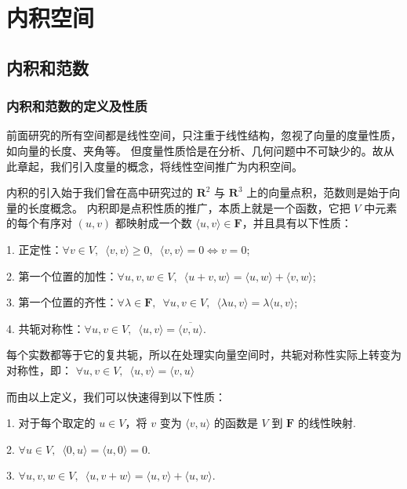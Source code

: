 \chapter{内积空间}

\section{内积和范数}
\subsection{内积和范数的定义及性质}
前面研究的所有空间都是线性空间，只注重于线性结构，忽视了向量的度量性质，如向量的长度、夹角等。
但度量性质恰是在分析、几何问题中不可缺少的。故从此章起，我们引入度量的概念，将线性空间推广为内积空间。

\vspace{2ex} 

内积的引入始于我们曾在高中研究过的 $\mathbf{R}^{2}$ 与 $\mathbf{R}^{3}$ 上的向量点积，范数则是始于向量的长度概念。
内积即是点积性质的推广，本质上就是一个函数，它把 $ V $ 中元素的每个有序对 $(u, v)$ 都映射成一个数 
$ \langle u, v \rangle \in \mathbf{F}$，并且具有以下性质：

1. 正定性：$\forall v \in V, \enspace \langle v, v \rangle \geqslant 0, \enspace \langle v, v \rangle = 0 \Leftrightarrow v = 0$; 

2. 第一个位置的加性：$\forall u, v, w \in V, \enspace \langle u + v, w \rangle = \langle u, w \rangle + \langle v, w \rangle$;

3. 第一个位置的齐性：$\forall \lambda \in \mathbf{F}, \enspace \forall u, v \in V, 
\enspace \langle \lambda u, v \rangle = \lambda \langle u, v \rangle$;

4. 共轭对称性：$\forall u, v \in V, \enspace \langle u, v \rangle = \overline{\langle v, u \rangle}$.

每个实数都等于它的复共轭，所以在处理实向量空间时，共轭对称性实际上转变为对称性，即：
$\forall u, v \in V, \enspace \langle u, v \rangle = \langle v, u \rangle$

而由以上定义，我们可以快速得到以下性质：

1. 对于每个取定的 $u \in V$，将 $ v $ 变为 $\langle v, u \rangle$ 的函数是 $ V $ 到 $\mathbf{F}$ 的线性映射.

2. $\forall u \in V, \enspace \langle 0, u \rangle = \langle u, 0 \rangle = 0$.

3. $\forall u, v, w \in V, \enspace \langle u, v + w \rangle = \langle u, v \rangle + \langle u, w \rangle$.

